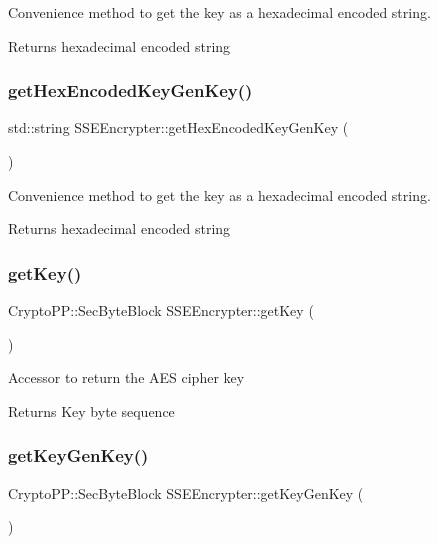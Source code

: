 Convenience method to get the key as a hexadecimal encoded string. \begin{DoxyReturn}{Returns}
hexadecimal encoded string 
\end{DoxyReturn}
\mbox{\label{classSSEEncrypter_abaefa48cff26cad49a17a1bd2586dbc7}} 
\subsubsection{\texorpdfstring{get\+Hex\+Encoded\+Key\+Gen\+Key()}{getHexEncodedKeyGenKey()}}
{\footnotesize\ttfamily std\+::string S\+S\+E\+Encrypter\+::get\+Hex\+Encoded\+Key\+Gen\+Key (\begin{DoxyParamCaption}{ }\end{DoxyParamCaption})}

Convenience method to get the key as a hexadecimal encoded string. \begin{DoxyReturn}{Returns}
hexadecimal encoded string 
\end{DoxyReturn}
\mbox{\label{classSSEEncrypter_ae9562054f00a5f9899b019568cad2338}} 
\subsubsection{\texorpdfstring{get\+Key()}{getKey()}}
{\footnotesize\ttfamily Crypto\+P\+P\+::\+Sec\+Byte\+Block S\+S\+E\+Encrypter\+::get\+Key (\begin{DoxyParamCaption}{ }\end{DoxyParamCaption})}

Accessor to return the A\+ES cipher key \begin{DoxyReturn}{Returns}
Key byte sequence 
\end{DoxyReturn}
\mbox{\label{classSSEEncrypter_a0fa90c40369bc916f61e870fd39a42c2}} 
\subsubsection{\texorpdfstring{get\+Key\+Gen\+Key()}{getKeyGenKey()}}
{\footnotesize\ttfamily Crypto\+P\+P\+::\+Sec\+Byte\+Block S\+S\+E\+Encrypter\+::get\+Key\+Gen\+Key (\begin{DoxyParamCaption}{ }\end{DoxyParamCaption})}

